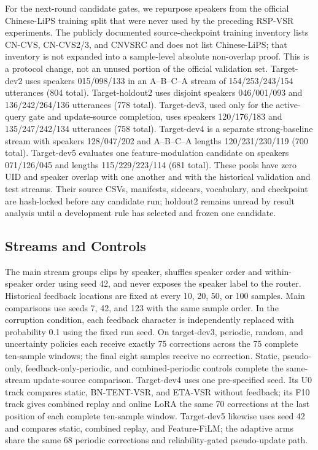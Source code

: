 For the next-round candidate gates, we repurpose speakers from the official Chinese-LiPS training split that were never used by the preceding RSP-VSR experiments. The publicly documented source-checkpoint training inventory lists CN-CVS, CN-CVS2/3, and CNVSRC and does not list Chinese-LiPS; that inventory is not expanded into a sample-level absolute non-overlap proof. This is a protocol change, not an unused portion of the official validation set. Target-dev2 uses speakers 015/098/133 in an A--B--C--A stream of 154/253/243/154 utterances (804 total). Target-holdout2 uses disjoint speakers 046/001/093 and 136/242/264/136 utterances (778 total). Target-dev3, used only for the active-query gate and update-source completion, uses speakers 120/176/183 and 135/247/242/134 utterances (758 total). Target-dev4 is a separate strong-baseline stream with speakers 128/047/202 and A--B--C--A lengths 120/231/230/119 (700 total). Target-dev5 evaluates one feature-modulation candidate on speakers 071/126/045 and lengths 115/229/223/114 (681 total). These pools have zero UID and speaker overlap with one another and with the historical validation and test streams. Their source CSVs, manifests, sidecars, vocabulary, and checkpoint are hash-locked before any candidate run; holdout2 remains unread by result analysis until a development rule has selected and frozen one candidate.

\subsection{Streams and Controls}

The main stream groups clips by speaker, shuffles speaker order and within-speaker order using seed 42, and never exposes the speaker label to the router. Historical feedback locations are fixed at every 10, 20, 50, or 100 samples. Main comparisons use seeds 7, 42, and 123 with the same sample order. In the corruption condition, each feedback character is independently replaced with probability 0.1 using the fixed run seed. On target-dev3, periodic, random, and uncertainty policies each receive exactly 75 corrections across the 75 complete ten-sample windows; the final eight samples receive no correction. Static, pseudo-only, feedback-only-periodic, and combined-periodic controls complete the same-stream update-source comparison. Target-dev4 uses one pre-specified seed. Its U0 track compares static, BN-TENT-VSR, and ETA-VSR without feedback; its F10 track gives combined replay and online LoRA the same 70 corrections at the last position of each complete ten-sample window. Target-dev5 likewise uses seed 42 and compares static, combined replay, and Feature-FiLM; the adaptive arms share the same 68 periodic corrections and reliability-gated pseudo-update path.

